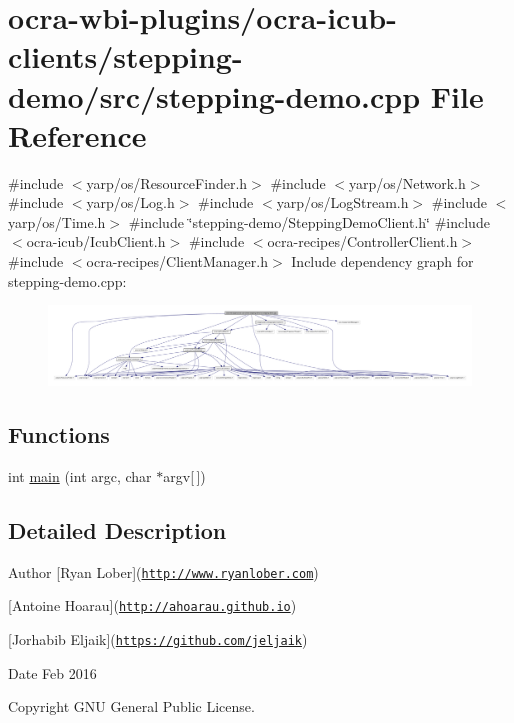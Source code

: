 \hypertarget{stepping-demo_8cpp}{\section{ocra-\/wbi-\/plugins/ocra-\/icub-\/clients/stepping-\/demo/src/stepping-\/demo.cpp \-File \-Reference}
\label{stepping-demo_8cpp}
}
{\ttfamily \#include $<$yarp/os/\-Resource\-Finder.\-h$>$}\*
{\ttfamily \#include $<$yarp/os/\-Network.\-h$>$}\*
{\ttfamily \#include $<$yarp/os/\-Log.\-h$>$}\*
{\ttfamily \#include $<$yarp/os/\-Log\-Stream.\-h$>$}\*
{\ttfamily \#include $<$yarp/os/\-Time.\-h$>$}\*
{\ttfamily \#include \char`\"{}stepping-\/demo/\-Stepping\-Demo\-Client.\-h\char`\"{}}\*
{\ttfamily \#include $<$ocra-\/icub/\-Icub\-Client.\-h$>$}\*
{\ttfamily \#include $<$ocra-\/recipes/\-Controller\-Client.\-h$>$}\*
{\ttfamily \#include $<$ocra-\/recipes/\-Client\-Manager.\-h$>$}\*
\-Include dependency graph for stepping-\/demo.cpp\-:\nopagebreak
\begin{figure}[H]
\begin{center}
\leavevmode
\includegraphics[width=350pt]{stepping-demo_8cpp__incl}
\end{center}
\end{figure}
\subsection*{\-Functions}
\begin{DoxyCompactItemize}
\item 
int \hyperlink{stepping-demo_8cpp_a0ddf1224851353fc92bfbff6f499fa97}{main} (int argc, char $\ast$argv\mbox{[}$\,$\mbox{]})
\end{DoxyCompactItemize}


\subsection{\-Detailed \-Description}
\begin{DoxyAuthor}{\-Author}
\mbox{[}\-Ryan \-Lober\mbox{]}(\href{http://www.ryanlober.com}{\tt http\-://www.\-ryanlober.\-com}) 

\mbox{[}\-Antoine \-Hoarau\mbox{]}(\href{http://ahoarau.github.io}{\tt http\-://ahoarau.\-github.\-io}) 

\mbox{[}\-Jorhabib \-Eljaik\mbox{]}(\href{https://github.com/jeljaik}{\tt https\-://github.\-com/jeljaik}) 
\end{DoxyAuthor}
\begin{DoxyDate}{\-Date}
\-Feb 2016 
\end{DoxyDate}
\begin{DoxyCopyright}{\-Copyright}
\-G\-N\-U \-General \-Public \-License. 
\end{DoxyCopyright}



